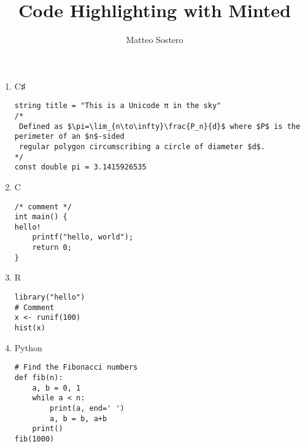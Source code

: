 \documentclass[10pt,a4paper]{article}
\title{Code Highlighting with Minted}
\author{Matteo Sostero}
\begin{document}
\maketitle

\begin{enumerate}

\item C♯
\begin{verbatim}
string title = "This is a Unicode π in the sky"
/*
 Defined as $\pi=\lim_{n\to\infty}\frac{P_n}{d}$ where $P$ is the perimeter of an $n$-sided
 regular polygon circumscribing a circle of diameter $d$.
*/
const double pi = 3.1415926535
\end{verbatim}

\item C
\begin{verbatim}
/* comment */
int main() {
hello!
	printf("hello, world");
	return 0;
}
\end{verbatim}

\item R
\begin{verbatim}
library("hello")
# Comment
x <- runif(100)
hist(x)
\end{verbatim}

\item Python
\begin{verbatim}
# Find the Fibonacci numbers
def fib(n):
    a, b = 0, 1
    while a < n:
        print(a, end=' ')
        a, b = b, a+b
    print()
fib(1000)
\end{verbatim}
\end{enumerate}
\end{document}
